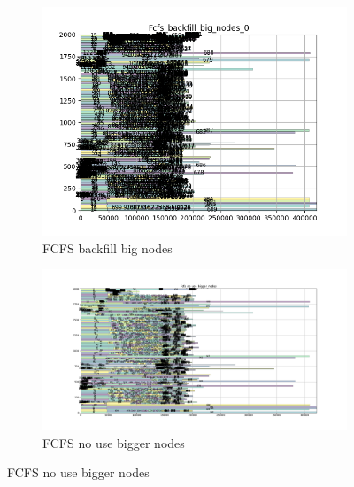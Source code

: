 \documentclass[a4paper]{article}
\begin{document}
\begin{figure}[H]\centering
\begin{subfigure}[b]{0.4\linewidth}\centering\includegraphics[width=1\linewidth]{MBSS/plot/Gantt_charts/Fcfs_backfill_big_nodes_0.png}\caption{FCFS backfill big nodes}\end{subfigure}
\begin{subfigure}[b]{0.4\linewidth}\centering\includegraphics[width=1\linewidth]{MBSS/plot/Gantt_charts/Fcfs_no_use_bigger_nodes.png}\caption{FCFS no use bigger nodes}\end{subfigure}

\end{figure}
\end{document}

